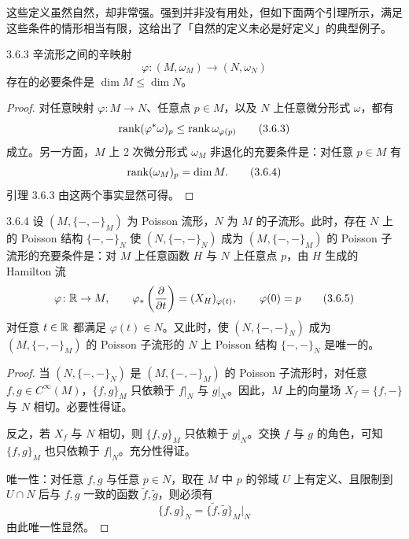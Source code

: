这些定义虽然自然，却非常强。强到并非没有用处，但如下面两个引理所示，满足这些条件的情形相当有限，这给出了「自然的定义未必是好定义」的典型例子。

\begin{lemma*}{3.6.3}
  辛流形之间的辛映射
  \[
    \varphi\colon(M,\omega_M)\to(N,\omega_N)
  \]
  存在的必要条件是 $\dim M\le \dim N$。
\end{lemma*}

\begin{proof}
  对任意映射 $\varphi\colon M\to N$、任意点 $p\in M$，以及 $N$ 上任意微分形式 $\omega$，都有
  \begin{equation}
    \operatorname{rank}(\varphi^*\omega)_p\le \operatorname{rank}\omega_{\varphi(p)}
    \tag{3.6.3}
  \end{equation}
  成立。另一方面，$M$ 上 2 次微分形式 $\omega_M$ 非退化的充要条件是：对任意 $p\in M$ 有
  \begin{equation}
    \operatorname{rank}(\omega_M)_p=\dim M.
    \tag{3.6.4}
  \end{equation}
  引理 3.6.3 由这两个事实显然可得。
\end{proof}

\begin{lemma*}{3.6.4}
  设 $(M,\{-,-\}_M)$ 为 Poisson 流形，$N$ 为 $M$ 的子流形。此时，存在 $N$ 上的 Poisson 结构 $\{-,-\}_N$ 使 $(N,\{-,-\}_N)$ 成为 $(M,\{-,-\}_M)$ 的 Poisson 子流形的充要条件是：对 $M$ 上任意函数 $H$ 与 $N$ 上任意点 $p$，由 $H$ 生成的 Hamilton 流
  \begin{equation}
    \varphi\colon\mathbb{R}\to M,\qquad
    \varphi_*\left(\frac{\partial}{\partial t}\right)=(X_H)_{\varphi(t)},\qquad
    \varphi(0)=p
    \tag{3.6.5}
  \end{equation}
  对任意 $t\in\mathbb{R}$ 都满足 $\varphi(t)\in N$。又此时，使 $(N,\{-,-\}_N)$ 成为 $(M,\{-,-\}_M)$ 的 Poisson 子流形的 $N$ 上 Poisson 结构 $\{-,-\}_N$ 是唯一的。
\end{lemma*}

\begin{proof}
  当 $(N,\{-,-\}_N)$ 是 $(M,\{-,-\}_M)$ 的 Poisson 子流形时，对任意 $f,g\in C^\infty(M)$，$\{f,g\}_M$ 只依赖于 $f|_N$ 与 $g|_N$。因此，$M$ 上的向量场 $X_f=\{f,-\}$ 与 $N$ 相切。必要性得证。

  反之，若 $X_f$ 与 $N$ 相切，则 $\{f,g\}_M$ 只依赖于 $g|_N$。交换 $f$ 与 $g$ 的角色，可知 $\{f,g\}_M$ 也只依赖于 $f|_N$。充分性得证。

  唯一性：对任意 $f,g$ 与任意 $p\in N$，取在 $M$ 中 $p$ 的邻域 $U$ 上有定义、且限制到 $U\cap N$ 后与 $f,g$ 一致的函数 $\tilde f,\tilde g$，则必须有
  \begin{equation}
    \{f,g\}_N=\{\tilde f,\tilde g\}_M\big|_N
    \tag{3.6.6}
  \end{equation}
  由此唯一性显然。
\end{proof}

